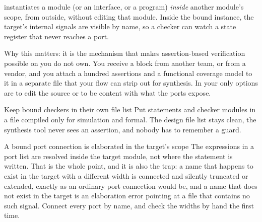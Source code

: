 
 instantiates a module (or an interface, or a program) \emph{inside}
another module's scope, from outside, without editing that module. Inside the
bound instance, the target's internal signals are visible by name, so a
checker can watch a state register that never reaches a port.

Why this matters: it is the mechanism that makes assertion-based verification
possible on \RTL{} you do not own. You receive a block from another team, or
from a vendor, and you attach a hundred assertions and a functional coverage
model to it in a separate file that your flow can strip out for synthesis. In
\VHDL{} your only options are to edit the source or to be content with what
the ports expose.

\begin{tipbox}{Keep bound checkers in their own file list}
Put  statements and checker modules in a  file
compiled only for simulation and formal. The design file list stays clean, the
synthesis tool never sees an assertion, and nobody has to remember a
 guard.
\end{tipbox}

\begin{gotcha}{A bound port connection is elaborated in the target's scope}
The expressions in a  port list are resolved inside the target
module, not where the  statement is written. That is the whole
point, and it is also the trap: a name that happens to exist in the target
with a different width is connected and silently truncated or extended,
exactly as an ordinary port connection would be, and a name that does not
exist in the target is an elaboration error pointing at a file that contains
no such signal. Connect every port by name, and check the widths by hand the
first time.
\end{gotcha}

